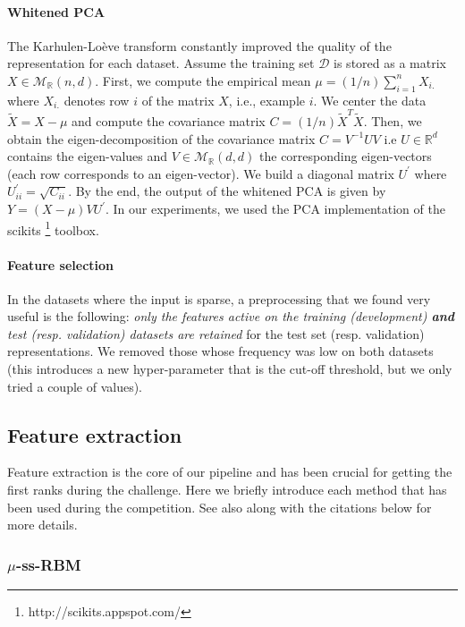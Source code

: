 \paragraph{Whitened PCA} The Karhulen-Lo\`{e}ve transform constantly improved the
quality of the representation for each dataset. Assume the training set
$\mathcal{D}$ is stored as a matrix $X\in\mathcal{M}_\mathbb{R}(n,d)$. First,
we compute the empirical mean $\mu=(1/n)\sum_{i=1}^n X_{i.}$ where $X_{i.}$
denotes row $i$ of the matrix $X$, i.e., example $i$. 
We center the data $\tilde{X}=X-\mu$ and
compute the covariance matrix $C=(1/n)\tilde{X}^T\tilde{X}$.  Then, we obtain the
eigen-decomposition of the covariance matrix $C=V^{-1}UV$ i.e
$U\in\mathbb{R}^d$ contains the eigen-values and
$V\in\mathcal{M}_{\mathbb{R}}(d,d)$ the corresponding eigen-vectors (each row
corresponds to an eigen-vector).  We build a diagonal matrix $U^{'}$ where
$U^{'}_{ii}=\sqrt{C_{ii}}$.  By the end, the output of the whitened PCA is
given by $Y=(X-\mu)VU^{'}$. In our experiments, we used the PCA 
implementation of the scikits
\footnote{http://scikits.appspot.com/} toolbox. 


\paragraph{Feature selection} In the datasets where the input is sparse, a
preprocessing that we found very useful is the following: {\em only the
features active on the training (development) {\bf and} test (resp. validation)
datasets are retained} for the test set (resp. validation) representations.  We
removed those whose frequency was low on both datasets (this introduces a new
hyper-parameter that is the cut-off threshold, but we only tried a couple of
values).

\subsection{Feature extraction}

Feature extraction is the core of our pipeline and has been crucial for getting
the first ranks during the challenge. Here we briefly introduce each method
that has been used during the competition. See also \citet{Bengio-DL-2011}
along with the citations below for more details.

\subsubsection{$\mu$-ss-RBM}

